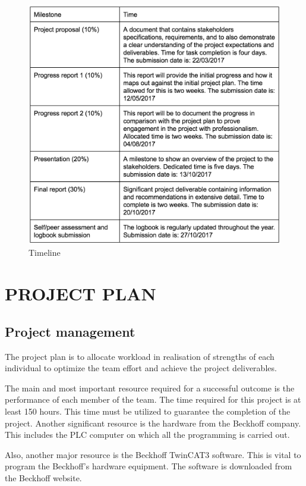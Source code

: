 \documentclass[a4paper, 10pt, conference]{IEEEconf}
\begin{document}
\begin{figure}[h!]
  \includegraphics[width=\linewidth]{images/Timeline}
  \caption{Timeline}
  \label{fig:Timeline}
\end{figure}


\section{PROJECT PLAN}

\subsection{Project management}

The project plan is to allocate workload in realisation of strengths of each individual to optimize the team effort and achieve the project deliverables. 

The main and most important resource required for a successful outcome is the performance of each member of the team. The time required for this project is at least 150 hours. This time must be utilized to guarantee the completion of the project.
Another significant resource is the hardware from the Beckhoff company. This includes the PLC computer on which all the programming is carried out.

Also, another major resource is the Beckhoff TwinCAT3 software. This is vital to program the Beckhoff's hardware equipment. The software is downloaded from the Beckhoff website.
\end{document}
